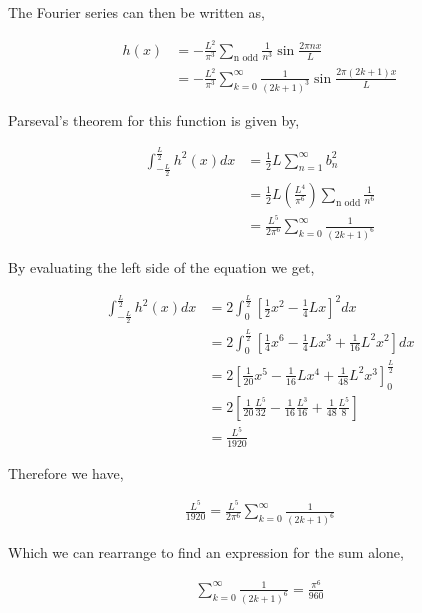 \documentclass[11pt]{amsart}
\begin{document}
The Fourier series can then be written as,

\begin{align*}
  h(x) &= -\frac{L^2}{\pi^3} \sum\limits_{\text{n odd}}\frac{1}{n^3}\sin{\frac{2\pi nx}{L}} \\
       &= -\frac{L^2}{\pi^3} \sum\limits_{k=0}^{\infty}\frac{1}{{(2k+1)}^3}\sin{\frac{2\pi(2k+1)x}{L}}
\end{align*}

Parseval's theorem for this function is given by,

\begin{align*}
  \int_{-\frac{L}{2}}^{\frac{L}{2}}h^2(x)dx&=\frac{1}{2}L\sum\limits_{n=1}^{\infty}b_n^2 \\
                                           &=\frac{1}{2}L\left(\frac{L^4}{\pi^6}\right)\sum\limits_{\text{n odd}}\frac{1}{n^6} \\
                                           &=\frac{L^5}{2\pi^6}\sum\limits_{k=0}^{\infty}\frac{1}{{(2k+1)}^6}
\end{align*}

By evaluating the left side of the equation we get,

\begin{align*}
  \int_{-\frac{L}{2}}^{\frac{L}{2}}h^2(x)dx&=2\int_0^{\frac{L}{2}}{\left[\frac{1}{2}x^2-\frac{1}{4}Lx\right]}^2 dx \\
                                           &=2\int_0^{\frac{L}{2}}\left[\frac{1}{4}x^6-\frac{1}{4}Lx^3+\frac{1}{16}L^2x^2\right]dx \\
                                           &=2{\left[\frac{1}{20}x^5-\frac{1}{16}Lx^4+\frac{1}{48}L^2x^3\right]}_0^{\frac{L}{2}} \\
                                           &=2\left[\frac{1}{20}\frac{L^5}{32}-\frac{1}{16}\frac{L^3}{16}+\frac{1}{48}\frac{L^5}{8}\right] \\
                                           &=\frac{L^5}{1920}
\end{align*}

Therefore we have,

\begin{align*}
  \frac{L^5}{1920}=\frac{L^5}{2\pi^6}\sum\limits_{k=0}^{\infty}\frac{1}{{(2k+1)}^6}
\end{align*}

Which we can rearrange to find an expression for the sum alone,

\begin{align*}
  \sum\limits_{k=0}^{\infty}\frac{1}{{(2k+1)}^6}=\frac{\pi^6}{960}
\end{align*}
\end{document}
